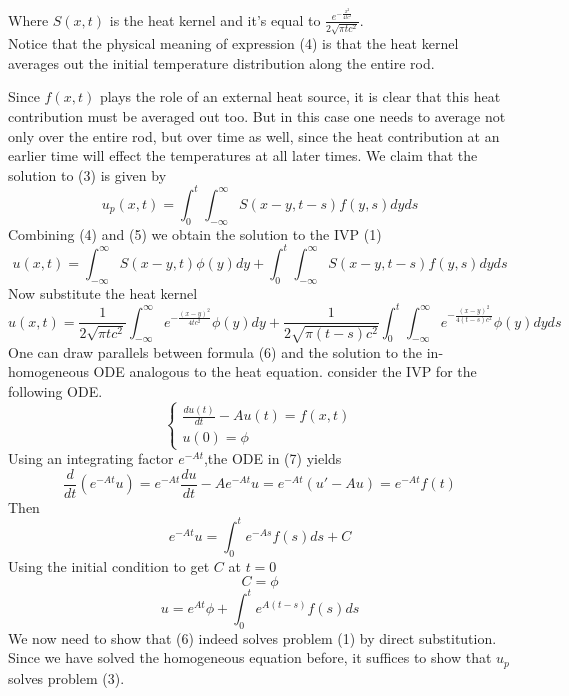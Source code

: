 \documentclass[]{article}
\begin{document}
Where $S(x,t)$ is the heat kernel and it's equal to $\displaystyle \frac{\textstyle e^{-\frac{x^2}{4tc^2}}}{2\sqrt{\pi tc^2}}$.
\\
Notice that the physical meaning of expression (4) is that the heat
kernel averages out the initial temperature distribution along the entire rod.
\par
Since $f(x, t)$ plays the role of an external heat source, it is clear that this heat contribution must be averaged out too. 
But in this case one needs to average not only over the entire rod, but over time as well, 
since the heat contribution at an earlier time will effect the temperatures at all later times. 
We claim that the solution to (3) is given by
\begin{equation}
    u_p(x,t) = \int_{0}^{t}\int_{-\infty}^{\infty}S(x-y,t-s) f(y,s)dyds
\end{equation}
Combining (4) and (5) we obtain the solution to the IVP (1)
\begin{equation}
    u(x,t)  = \int_{-\infty}^{\infty}S(x-y,t) \phi(y)dy + \int_{0}^{t}\int_{-\infty}^{\infty}S(x-y,t-s) f(y,s)dyds
\end{equation}
Now substitute the heat kernel
\[
    u(x,t) = \frac{1}{2\sqrt{\pi tc^2}}\int_{-\infty}^{\infty}e^{\textstyle -\frac{{(x-y)}^2}{4tc^2}} \phi(y)dy + \frac{1}{2\sqrt{\pi (t-s)c^2}} \int_{0}^{t} \int_{-\infty}^{\infty}e^{\textstyle -\frac{{(x-y)}^2}{4(t-s)c^2}} \phi(y)dyds            
\]
One can draw parallels between formula (6) and the solution to the in-homogeneous ODE analogous
to the heat equation. consider the IVP for the following ODE.
\begin{equation}
    \begin{cases}
        \displaystyle \frac{du(t)}{dt} - A u(t) = f(x,t)
        \\
        u(0) = \phi
    \end{cases}
\end{equation}
Using an integrating factor $e^{-At}$,the ODE in (7) yields
\[
\frac{d}{dt}\left(e^{-At}u\right)= e^{-At} \frac{du}{dt} - Ae^{-At} u  = e^{-At}(u'-Au) = e^{-At} f(t)
\]
Then
\[
    e^{-At}u = \int_{0}^{t} e^{-As} f(s)ds + C
\]
Using the initial condition to get $C$ at $t=0$
\[
C = \phi    
\]
\[
    u = e^{At}\phi + \int_{0}^{t} e^{A(t-s)} f(s)ds
\]
We now need to show that (6) indeed solves problem (1) by direct substitution. 
\\
Since we have solved the homogeneous equation before, it suffices to show that $u_p$ solves problem (3). 
\par
\end{document}
